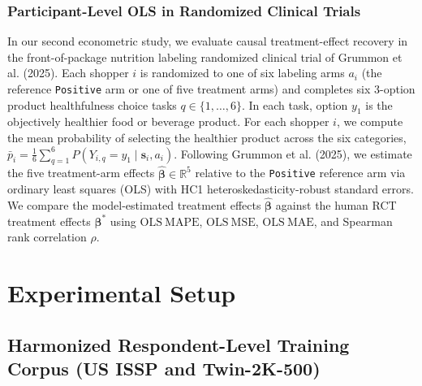 \documentclass[
  letterpaper,
  DIV=11,
  numbers=noendperiod]{scrartcl}
\begin{document}
\subsubsection{Participant-Level OLS in Randomized Clinical
Trials}\label{participant-level-ols-in-randomized-clinical-trials}

In our second econometric study, we evaluate causal treatment-effect
recovery in the front-of-package nutrition labeling randomized clinical
trial of Grummon et al. (2025). Each shopper \(i\) is randomized to one
of six labeling arms \(a_i\) (the reference \texttt{Positive} arm or one
of five treatment arms) and completes six 3-option product healthfulness
choice tasks \(q \in \{1, \dots, 6\}\). In each task, option \(y_1\) is
the objectively healthier food or beverage product. For each shopper
\(i\), we compute the mean probability of selecting the healthier
product across the six categories,
\(\bar{p}_i = \frac{1}{6} \sum_{q=1}^6 P(Y_{i,q} = y_1 \mid \mathbf{s}_i, a_i)\).
Following Grummon et al. (2025), we estimate the five treatment-arm
effects \(\hat{\boldsymbol{\beta}} \in \mathbb{R}^5\) relative to the
\texttt{Positive} reference arm via ordinary least squares (OLS) with
HC1 heteroskedasticity-robust standard errors. We compare the
model-estimated treatment effects \(\hat{\boldsymbol{\beta}}\) against
the human RCT treatment effects \(\boldsymbol{\beta}^*\) using
\(\mathrm{OLS\ MAPE}\), \(\mathrm{OLS\ MSE}\), \(\mathrm{OLS\ MAE}\),
and Spearman rank correlation \(\rho\).

\section{Experimental Setup}\label{sec-experiments}

\subsection{Harmonized Respondent-Level Training Corpus (US ISSP and
Twin-2K-500)}\label{harmonized-respondent-level-training-corpus-us-issp-and-twin-2k-500}
\end{document}
